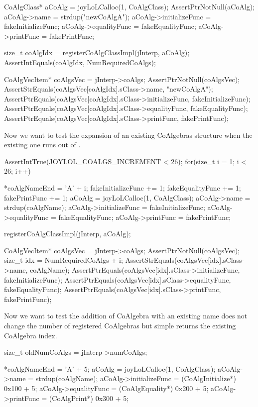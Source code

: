   CoAlgClass* aCoAlg   = joyLoLCalloc(1, CoAlgClass);
  AssertPtrNotNull(aCoAlg);
  aCoAlg->name           = strdup("newCoAlgA");
  aCoAlg->initializeFunc = fakeInitializeFunc;
  aCoAlg->equalityFunc   = fakeEqualityFunc;
  aCoAlg->printFunc      = fakePrintFunc;

  size_t coAlgIdx = registerCoAlgClassImpl(jInterp, aCoAlg);
  AssertIntEquals(coAlgIdx, NumRequiredCoAlgs);

  CoAlgVecItem* coAlgsVec = jInterp->coAlgs;
  AssertPtrNotNull(coAlgsVec);
  AssertStrEquals(coAlgsVec[coAlgIdx].sClass->name, "newCoAlgA");
  AssertPtrEquals(coAlgsVec[coAlgIdx].sClass->initializeFunc, fakeInitializeFunc);
  AssertPtrEquals(coAlgsVec[coAlgIdx].sClass->equalityFunc, fakeEqualityFunc);
  AssertPtrEquals(coAlgsVec[coAlgIdx].sClass->printFunc,    fakePrintFunc);
\stopCTest

Now we want to test the expansion of an existing CoAlgebras structure when 
the existing one runs out of . 

\startCTest
  AssertIntTrue(JOYLOL_COALGS_INCREMENT < 26);
  for(size_t i = 1; i < 26; i++) {
    *coAlgNameEnd          = 'A' + i;
    fakeInitializeFunc    += 1;
    fakeEqualityFunc      += 1;
    fakePrintFunc         += 1;
    aCoAlg                 = joyLoLCalloc(1, CoAlgClass);
    aCoAlg->name           = strdup(coAlgName);
    aCoAlg->initializeFunc = fakeInitializeFunc;
    aCoAlg->equalityFunc   = fakeEqualityFunc;
    aCoAlg->printFunc      = fakePrintFunc;

    registerCoAlgClassImpl(jInterp, aCoAlg);

    CoAlgVecItem* coAlgsVec = jInterp->coAlgs;
    AssertPtrNotNull(coAlgsVec);
    size_t idx = NumRequiredCoAlgs + i;
    AssertStrEquals(coAlgsVec[idx].sClass->name, coAlgName);
    AssertPtrEquals(coAlgsVec[idx].sClass->initializeFunc, fakeInitializeFunc);
    AssertPtrEquals(coAlgsVec[idx].sClass->equalityFunc, fakeEqualityFunc);
    AssertPtrEquals(coAlgsVec[idx].sClass->printFunc,    fakePrintFunc);
  }
\stopCTest

Now we want to test the addition of CoAlgebra with an existing name does 
not change the number of registered CoAlgebras but simple returns the 
existing CoAlgebra index. 

\startCTest
  size_t oldNumCoAlgs  = jInterp->numCoAlgs;

  *coAlgNameEnd          = 'A' + 5;
  aCoAlg                 = joyLoLCalloc(1, CoAlgClass);
  aCoAlg->name           = strdup(coAlgName);
  aCoAlg->initializeFunc = (CoAlgInitialize*) 0x100 + 5;
  aCoAlg->equalityFunc   = (CoAlgEquality*)   0x200 + 5;
  aCoAlg->printFunc      = (CoAlgPrint*)      0x300 + 5;
  
